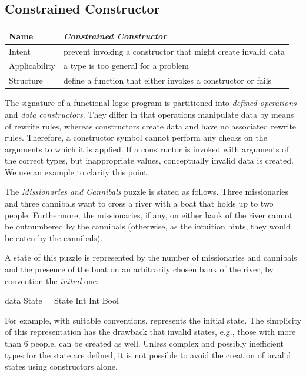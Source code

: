 \subsection{Constrained Constructor}\label{sec-constrained-constructor}

\begin{center}
\begin{tabular}{@{} | *{2}{@{\hspace{3pt}} l @{\hspace{3pt}} |} @{}}
\hline
Name & \emph{Constrained Constructor} \\
\hline 
Intent & prevent invoking a constructor that might create invalid data \\
\hline
Applicability & a type is too general for a problem \\
\hline
Structure & define a function that either invokes a constructor or fails \\
\hline
\end{tabular}
\end{center}
%
The signature of a functional logic program is partitioned into
\emph{defined operations} and \emph{data constructors}.
They differ in that operations manipulate data by means of rewrite rules,
whereas constructors create data and have no associated rewrite rules.
Therefore, a constructor symbol cannot perform any checks on the
arguments to which it is applied.  If a constructor is invoked
with arguments of the correct types, but inappropriate values,
conceptually invalid data is created.
We use an example to clarify this point.

The \emph{Missionaries and Cannibals} puzzle is stated as follows.
Three missionaries and three cannibals want to cross a river
with a boat that holds up to two people.
Furthermore, the missionaries, if any, on either bank of the river
cannot be outnumbered by the cannibals
(otherwise, as the intuition hints, they would be eaten by the cannibals).

A state of this puzzle is represented by the number of
missionaries and cannibals and the presence of the boat on an
arbitrarily chosen bank of the river, by convention the \emph{initial} one:
%
\begin{prog}
data State = State Int Int Bool
\end{prog}
%
For example, with suitable conventions,
 represents the initial state.
The simplicity of this representation has the drawback
that invalid states, e.g., those with more than 6 people,
can be created as well.
Unless complex and possibly inefficient types for the state are
defined, it is not possible to avoid the creation of invalid states
using constructors alone.

